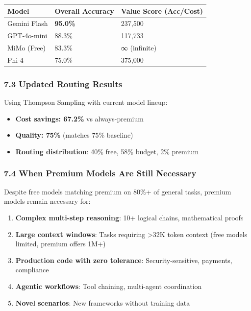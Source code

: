 \documentclass[
]{article}
\providecommand{\tightlist}{%
  \setlength{\itemsep}{0pt}\setlength{\parskip}{0pt}}
\begin{document}
\begin{longtable}[]{@{}lll@{}}
\toprule
Model & Overall Accuracy & Value Score (Acc/Cost) \\
\midrule
\endhead
Gemini Flash & \textbf{95.0\%} & 237,500 \\
GPT-4o-mini & 88.3\% & 117,733 \\
MiMo (Free) & 83.3\% & ∞ (infinite) \\
Phi-4 & 75.0\% & 375,000 \\
\bottomrule
\end{longtable}

\hypertarget{updated-routing-results}{%
\subsubsection{7.3 Updated Routing
Results}\label{updated-routing-results}}

Using Thompson Sampling with current model lineup:

\begin{itemize}
\tightlist
\item
  \textbf{Cost savings: 67.2\%} vs always-premium
\item
  \textbf{Quality: 75\%} (matches 75\% baseline)
\item
  \textbf{Routing distribution}: 40\% free, 58\% budget, 2\% premium
\end{itemize}

\hypertarget{when-premium-models-are-still-necessary}{%
\subsubsection{7.4 When Premium Models Are Still
Necessary}\label{when-premium-models-are-still-necessary}}

Despite free models matching premium on 80\%+ of general tasks, premium
models remain necessary for:

\begin{enumerate}
\def\labelenumi{\arabic{enumi}.}
\tightlist
\item
  \textbf{Complex multi-step reasoning}: 10+ logical chains,
  mathematical proofs
\item
  \textbf{Large context windows}: Tasks requiring \textgreater32K token
  context (free models limited, premium offers 1M+)
\item
  \textbf{Production code with zero tolerance}: Security-sensitive,
  payments, compliance
\item
  \textbf{Agentic workflows}: Tool chaining, multi-agent coordination
\item
  \textbf{Novel scenarios}: New frameworks without training data
\end{enumerate}
\end{document}
